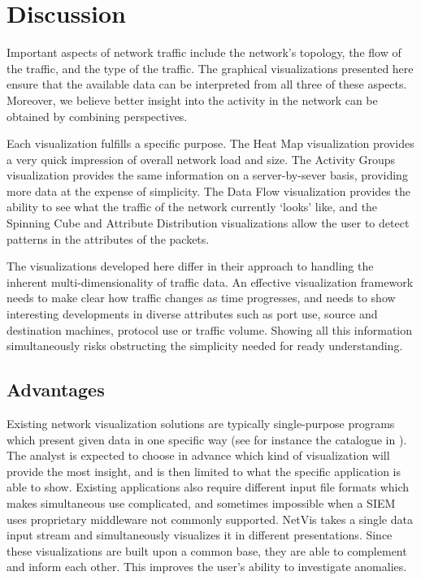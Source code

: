 \section{Discussion} \label{sec:discussion}
%
Important aspects of network traffic include the network's topology, the flow of the
traffic, and the type of the traffic. The graphical visualizations presented here ensure that the
available data can be interpreted from all three of these aspects. Moreover, we believe better
insight into the activity in the network can be obtained by combining perspectives.

Each visualization fulfills a specific purpose. The Heat Map visualization provides a very quick
impression of overall network load and size. The Activity Groups visualization provides the same
information on a server-by-sever basis, providing more data at the expense of simplicity.  The Data
Flow visualization provides the ability to see what the traffic of the network currently `looks'
like, and the Spinning Cube and Attribute Distribution visualizations allow the user to detect
patterns in the attributes of the packets.

The visualizations developed here differ in their approach to handling the inherent
multi-dimensionality of traffic data. An effective visualization framework needs to make clear how
traffic changes as time progresses, and needs to show interesting developments in diverse attributes
such as port use, source and destination machines, protocol use or traffic volume. Showing all this
information simultaneously risks obstructing the simplicity needed for ready understanding. 

\subsection{Advantages}
Existing network visualization solutions are typically single-purpose programs which present given
data in one specific way (see for instance the catalogue in \cite{marty2009applied}). The analyst is
expected to choose in advance which kind of visualization will provide the most insight, and is then
limited to what the specific application is able to show. Existing applications also require
different input file formats which makes simultaneous use complicated, and sometimes impossible when
a SIEM uses proprietary middleware not commonly supported. NetVis takes a single data input stream
and simultaneously visualizes it in different presentations. Since these visualizations are built
upon a common base, they are able to complement and inform each other. This improves the user's
ability to investigate anomalies.

